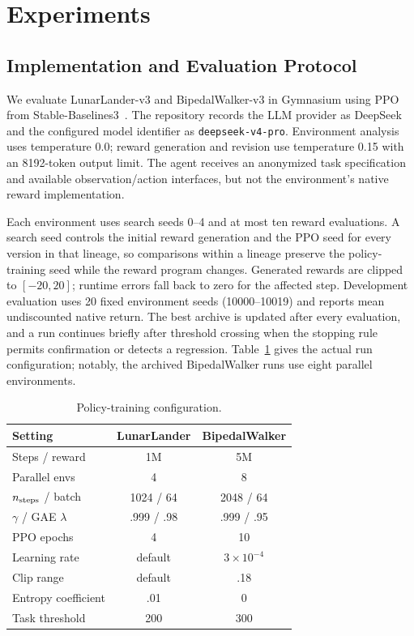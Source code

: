 \section{Experiments}
\subsection{Implementation and Evaluation Protocol}
We evaluate LunarLander-v3 and BipedalWalker-v3 in Gymnasium using PPO from Stable-Baselines3~\cite{ppo,sb3}. The repository records the LLM provider as DeepSeek and the configured model identifier as \texttt{deepseek-v4-pro}. Environment analysis uses temperature 0.0; reward generation and revision use temperature 0.15 with an 8192-token output limit. The agent receives an anonymized task specification and available observation/action interfaces, but not the environment's native reward implementation.

Each environment uses search seeds 0--4 and at most ten reward evaluations. A search seed controls the initial reward generation and the PPO seed for every version in that lineage, so comparisons within a lineage preserve the policy-training seed while the reward program changes. Generated rewards are clipped to $[-20,20]$; runtime errors fall back to zero for the affected step. Development evaluation uses 20 fixed environment seeds (10000--10019) and reports mean undiscounted native return. The best archive is updated after every evaluation, and a run continues briefly after threshold crossing when the stopping rule permits confirmation or detects a regression. Table~\ref{tab:setup} gives the actual run configuration; notably, the archived BipedalWalker runs use eight parallel environments.

\begin{table}[t]
\caption{Policy-training configuration.}
\label{tab:setup}
\centering
\scriptsize
\setlength{\tabcolsep}{2.7pt}
\begin{tabular}{lcc}
\toprule
Setting & LunarLander & BipedalWalker \\
\midrule
Steps / reward & 1M & 5M \\
Parallel envs & 4 & 8 \\
$n_{\rm steps}$ / batch & 1024 / 64 & 2048 / 64 \\
$\gamma$ / GAE $\lambda$ & .999 / .98 & .999 / .95 \\
PPO epochs & 4 & 10 \\
Learning rate & default & $3\times10^{-4}$ \\
Clip range & default & .18 \\
Entropy coefficient & .01 & 0 \\
Task threshold & 200 & 300 \\
\bottomrule
\end{tabular}
\end{table}

